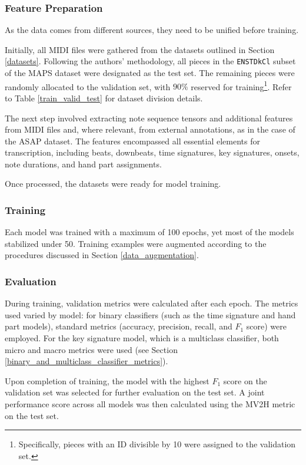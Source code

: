 \subsubsection{Feature Preparation}

As the data comes from different sources, they need to be unified before training.

Initially, all MIDI files were gathered from the datasets outlined in Section \ref{datasets}. Following the authors' methodology, all pieces in the \texttt{ENSTDkCl} subset of the MAPS dataset were designated as the test set. The remaining pieces were randomly allocated to the validation set, with $90\%$ reserved for training\footnote{Specifically, pieces with an ID divisible by 10 were assigned to the validation set.}. Refer to Table \ref{train_valid_test} for dataset division details.

The next step involved extracting note sequence tensors and additional features from MIDI files and, where relevant, from external annotations, as in the case of the ASAP dataset. The features encompassed all essential elements for transcription, including beats, downbeats, time signatures, key signatures, onsets, note durations, and hand part assignments.

Once processed, the datasets were ready for model training.

\subsubsection{Training}

Each model was trained with a maximum of 100 epochs, yet most of the models stabilized under 50. Training examples were augmented according to the procedures discussed in Section \ref{data_augmentation}.

\subsubsection{Evaluation}

During training, validation metrics were calculated after each epoch. The metrics used varied by model: for binary classifiers (such as the time signature and hand part models), standard metrics (accuracy, precision, recall, and $F_1$ score) were employed. For the key signature model, which is a multiclass classifier, both micro and macro metrics were used (see Section \ref{binary_and_multiclass_classifier_metrics}).

Upon completion of training, the model with the highest $F_1$ score on the validation set was selected for further evaluation on the test set. A joint performance score across all models was then calculated using the MV2H metric on the test set.

